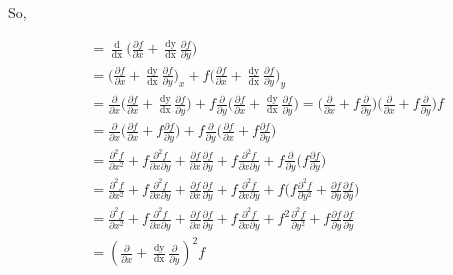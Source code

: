 \documentclass[12 pt]{article}
\begin{document}
So, 

{
\large
\begin{equation*}
\begin{split}
\frac{\mathop{\mathrm{d^{2}f}}}{\mathop{\mathrm{dx^{2}}}} &= \frac{\mathop{\mathrm{d}}}{\mathop{\mathrm{dx}}}\bigg(\frac{\partial f}{\partial x} + \frac{\mathop{\mathrm{dy}}}{\mathop{\mathrm{dx}}}\frac{\partial f}{\partial y}\bigg)\\ 
												  &=  \bigg(\frac{\partial f}{\partial x}+\frac{\mathop{\mathrm{dy}}}{\mathop{\mathrm{dx}}}\frac{\partial f}{\partial y}\bigg)_{x} +   f\bigg(\frac{\partial f}{\partial x}+\frac{\mathop{\mathrm{dy}}}{\mathop{\mathrm{dx}}}\frac{\partial f}{\partial y}\bigg)_{y}\\
												  &= \frac{\partial }{\partial x}\bigg(\frac{\partial f}{\partial x}+\frac{\mathop{\mathrm{dy}}}{\mathop{\mathrm{dx}}}\frac{\partial f}{\partial y}\bigg)+f\frac{\partial }{\partial y}\bigg(\frac{\partial f}{\partial x}+\frac{\mathop{\mathrm{dy}}}{\mathop{\mathrm{dx}}}\frac{\partial f}{\partial y}\bigg)=\bigg(\frac{\partial }{\partial x}+f\frac{\partial }{\partial y}\bigg)\bigg(\frac{\partial }{\partial x}+f\frac{\partial }{\partial y}\bigg)f\\
												  &= \frac{\partial }{\partial x}\bigg(\frac{\partial f}{\partial x}+f\frac{\partial f}{\partial y}\bigg)+f\frac{\partial }{\partial y}\bigg(\frac{\partial f}{\partial x}+f\frac{\partial f}{\partial y}\bigg)\\
												  &= \frac{\partial^{2}f}{\partial x^{2}} + f\frac{\partial^{2}f}{\partial x \partial y}+\frac{\partial f}{\partial x}\frac{\partial f}{\partial y} + f\frac{\partial^{2}f}{\partial x \partial y} + f\frac{\partial }{\partial y}\bigg(f\frac{\partial f}{\partial y}\bigg)\\
												  &= \frac{\partial^{2}f}{\partial x^{2}} + f\frac{\partial^{2}f}{\partial x \partial y}+\frac{\partial f}{\partial x}\frac{\partial f}{\partial y} + f\frac{\partial^{2}f}{\partial x \partial y} + f\bigg(f\frac{\partial^{2}f}{\partial y^{2}}+\frac{\partial f}{\partial y}\frac{\partial f}{\partial y}\bigg)\\
												  &= \frac{\partial^{2}f}{\partial x^{2}} + f\frac{\partial^{2}f}{\partial x \partial y}+\frac{\partial f}{\partial x}\frac{\partial f}{\partial y} + f\frac{\partial^{2}f}{\partial x \partial y} + f^{2}\frac{\partial^{2}f}{\partial y^{2}}+f\frac{\partial f}{\partial y}\frac{\partial f}{\partial y}\\
												  &=  (\frac{\partial }{\partial x} + \frac{\mathop{\mathrm{dy}}}{\mathop{\mathrm{dx}}}\frac{\partial }{\partial y})^{2}f\\
\end{split}
\end{equation*}
}
\newpage
\end{document}
